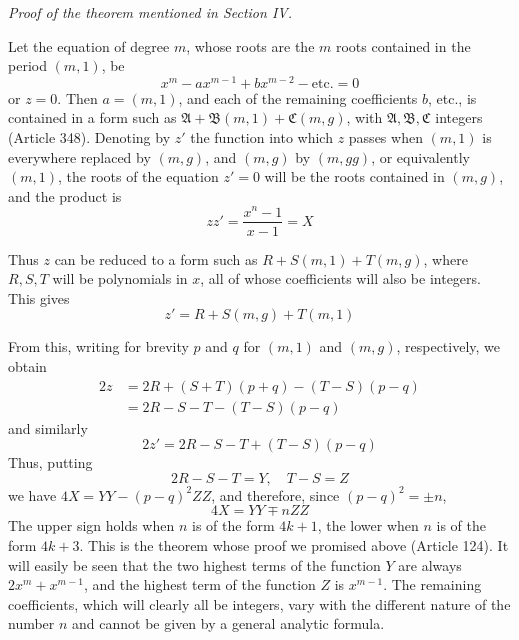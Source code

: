 \begin{center}\itshape \textit{Proof of the theorem mentioned in Section IV.}\end{center}


Let the equation of degree \(m\), whose roots are the \(m\) roots contained in the period \((m,1)\), be \[x^m-ax^{m-1}+bx^{m-2}-\text{etc.}=0\] or \(z=0\). Then \(a=(m,1)\), and each of the remaining coefficients \(b\), etc., is contained in a form such as \(\mathfrak A+\mathfrak B(m,1)+\mathfrak C(m,g)\), with \(\mathfrak A,\allowbreak \mathfrak B,\allowbreak \mathfrak C\) integers (Article 348). Denoting by \(z'\) the function into which \(z\) passes when \((m,1)\) is everywhere replaced by \((m,g)\), and \((m,g)\) by \((m,gg)\), or equivalently \((m,1)\), the roots of the equation \(z'=0\) will be the roots contained in \((m,g)\), and the product is \[zz'=\frac{x^n-1}{x-1}=X\]

Thus \(z\) can be reduced to a form such as \(R+S(m,1)+T(m,g)\), where \(R,\allowbreak S,\allowbreak T\) will be polynomials in \(x\), all of whose coefficients will also be integers. This gives \[z'=R+S(m,g)+T(m,1)\]

From this, writing for brevity \(p\) and \(q\) for \((m,1)\) and \((m,g)\), respectively, we obtain \[\begin{aligned}2z&=2R+(S+T)(p+q)-(T-S)(p-q)\\&=2R-S-T-(T-S)(p-q)\end{aligned}\] and similarly \[2z'=2R-S-T+(T-S)(p-q)\] Thus, putting \[2R-S-T=Y,\quad T-S=Z\]
we have \(4X=YY-(p-q)^2ZZ\), and therefore, since \((p-q)^2=\pm n\), \[4X=YY\mp nZZ\] The upper sign holds when \(n\) is of the form \(4k+1\), the lower when \(n\) is of the form \(4k+3\). This is the theorem whose proof we promised above (Article 124). It will easily be seen that the two highest terms of the function \(Y\) are always \(2x^m+x^{m-1}\), and the highest term of the function \(Z\) is \(x^{m-1}\). The remaining coefficients, which will clearly all be integers, vary with the different nature of the number \(n\) and cannot be given by a general analytic formula.


